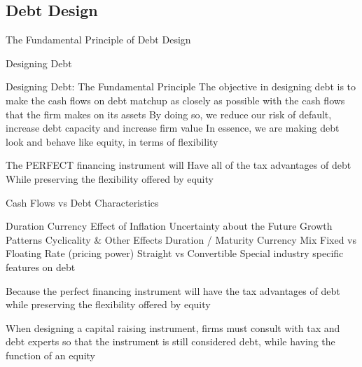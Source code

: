 \documentclass[10pt]{article}
\begin{document}
  \subsection{Debt Design}

    \begin{core}{The Fundamental Principle of Debt Design}

      Designing Debt

      Designing Debt: The Fundamental Principle
      The objective in designing debt is to make the cash flows on debt matchup as closely as possible with the cash flows that the firm makes on its assets
      By doing so, we reduce our risk of default, increase debt capacity and increase firm value
      In essence, we are making debt look and behave like equity, in terms of flexibility

      The PERFECT financing instrument will
      Have all of the tax advantages of debt
      While preserving the flexibility offered by equity

      Cash Flows vs Debt Characteristics

      Duration
      Currency
      Effect of Inflation
      Uncertainty about the Future
      Growth Patterns
      Cyclicality & Other Effects
      Duration / Maturity
      Currency Mix
      Fixed vs Floating Rate
      (pricing power)
      Straight vs Convertible
      Special industry specific features on debt

      Because the perfect financing instrument will have the tax advantages of debt while preserving the flexibility offered by equity

      When designing a capital raising instrument, firms must consult with tax and debt experts so that the instrument is still considered debt, while having the function of an equity

    \end{core}
\end{document}
